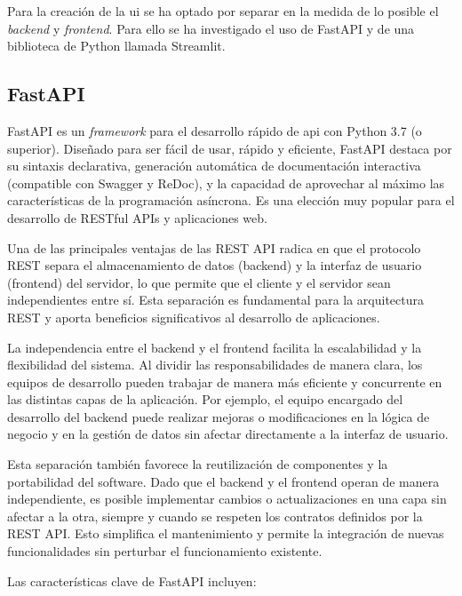 Para la creación de la \acrshort{ui} se ha optado por separar en la medida de lo posible el \textit{backend} y \textit{frontend}. Para ello se ha investigado el uso de FastAPI y de una biblioteca de Python llamada Streamlit.

\subsection{FastAPI}

FastAPI es un \textit{framework} para el desarrollo rápido de \acrshort{api} con Python 3.7 (o superior). Diseñado para ser fácil de usar, rápido y eficiente, FastAPI destaca por su sintaxis declarativa, generación automática de documentación interactiva (compatible con Swagger y ReDoc), y la capacidad de aprovechar al máximo las características de la programación asíncrona. Es una elección muy popular para el desarrollo de RESTful APIs y aplicaciones web.

Una de las principales ventajas de las REST API radica en que el protocolo REST separa el almacenamiento de datos (backend) y la interfaz de usuario (frontend) del servidor, lo que permite que el cliente y el servidor sean independientes entre sí. Esta separación es fundamental para la arquitectura REST y aporta beneficios significativos al desarrollo de aplicaciones.

La independencia entre el backend y el frontend facilita la escalabilidad y la flexibilidad del sistema. Al dividir las responsabilidades de manera clara, los equipos de desarrollo pueden trabajar de manera más eficiente y concurrente en las distintas capas de la aplicación. Por ejemplo, el equipo encargado del desarrollo del backend puede realizar mejoras o modificaciones en la lógica de negocio y en la gestión de datos sin afectar directamente a la interfaz de usuario.

Esta separación también favorece la reutilización de componentes y la portabilidad del software. Dado que el backend y el frontend operan de manera independiente, es posible implementar cambios o actualizaciones en una capa sin afectar a la otra, siempre y cuando se respeten los contratos definidos por la REST API. Esto simplifica el mantenimiento y permite la integración de nuevas funcionalidades sin perturbar el funcionamiento existente.

Las características clave de FastAPI incluyen:

